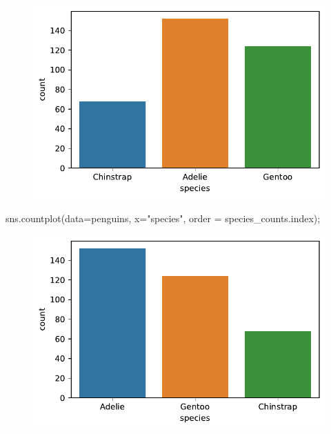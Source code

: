 \documentclass[
  a4paper,
  noprof,
  12pt,
  notoc,
  nosols,
  nobib]{mnye}
\newenvironment{Shaded}{\begin{snugshade}}{\end{snugshade}}
\newcommand{\NormalTok}[1]{\textcolor[rgb]{0.00,0.23,0.31}{#1}}
\newcommand{\OperatorTok}[1]{\textcolor[rgb]{0.37,0.37,0.37}{#1}}
\newcommand{\StringTok}[1]{\textcolor[rgb]{0.13,0.47,0.30}{#1}}
\theoremstyle{definition}
\theoremstyle{remark}
\begin{document}
\begin{figure}[tbph]

{\centering \includegraphics{chapters/1categorical_files/figure-pdf/cell-14-output-1.pdf}

}

\end{figure}

\begin{Shaded}
\begin{Highlighting}[]
\NormalTok{sns.countplot(data}\OperatorTok{=}\NormalTok{penguins, x}\OperatorTok{=}\StringTok{"species"}\NormalTok{, order }\OperatorTok{=}\NormalTok{ species\_counts.index)}\OperatorTok{;}
\end{Highlighting}
\end{Shaded}

\begin{figure}[tbph]

{\centering \includegraphics{chapters/1categorical_files/figure-pdf/cell-15-output-1.pdf}

}

\end{figure}
\end{document}

